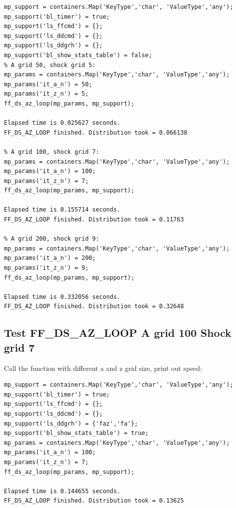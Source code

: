 \documentclass[
]{book}
\begin{document}
\begin{verbatim}
mp_support = containers.Map('KeyType','char', 'ValueType','any');
mp_support('bl_timer') = true;
mp_support('ls_ffcmd') = {};
mp_support('ls_ddcmd') = {};
mp_support('ls_ddgrh') = {};
mp_support('bl_show_stats_table') = false;
% A grid 50, shock grid 5:
mp_params = containers.Map('KeyType','char', 'ValueType','any');
mp_params('it_a_n') = 50;
mp_params('it_z_n') = 5;
ff_ds_az_loop(mp_params, mp_support);

Elapsed time is 0.025627 seconds.
FF_DS_AZ_LOOP finished. Distribution took = 0.066138

% A grid 100, shock grid 7:
mp_params = containers.Map('KeyType','char', 'ValueType','any');
mp_params('it_a_n') = 100;
mp_params('it_z_n') = 7;
ff_ds_az_loop(mp_params, mp_support);

Elapsed time is 0.155714 seconds.
FF_DS_AZ_LOOP finished. Distribution took = 0.11763

% A grid 200, shock grid 9:
mp_params = containers.Map('KeyType','char', 'ValueType','any');
mp_params('it_a_n') = 200;
mp_params('it_z_n') = 9;
ff_ds_az_loop(mp_params, mp_support);

Elapsed time is 0.332056 seconds.
FF_DS_AZ_LOOP finished. Distribution took = 0.32648
\end{verbatim}

\hypertarget{test-ff_ds_az_loop-a-grid-100-shock-grid-7}{%
\subsection{Test FF\_DS\_AZ\_LOOP A grid 100 Shock grid 7}\label{test-ff_ds_az_loop-a-grid-100-shock-grid-7}}

Call the function with different a and z grid size, print out speed:

\begin{verbatim}
mp_support = containers.Map('KeyType','char', 'ValueType','any');
mp_support('bl_timer') = true;
mp_support('ls_ffcmd') = {};
mp_support('ls_ddcmd') = {};
mp_support('ls_ddgrh') = {'faz','fa'};
mp_support('bl_show_stats_table') = true;
mp_params = containers.Map('KeyType','char', 'ValueType','any');
mp_params('it_a_n') = 100;
mp_params('it_z_n') = 7;
ff_ds_az_loop(mp_params, mp_support);

Elapsed time is 0.144655 seconds.
FF_DS_AZ_LOOP finished. Distribution took = 0.13625
\end{verbatim}
\end{document}
